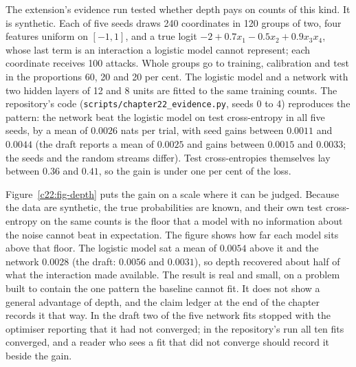 The extension's evidence run tested whether depth pays on counts of this kind. It is synthetic.
Each of five seeds draws 240 coordinates in 120 groups of two, four features uniform on $[-1,1]$,
and a true logit $-2+0.7x_1-0.5x_2+0.9x_3x_4$, whose last term is an interaction a logistic model
cannot represent; each coordinate receives 100 attacks. Whole groups go to training, calibration
and test in the proportions 60, 20 and 20 per cent. The logistic model and a network with two
hidden layers of 12 and 8 units are fitted to the same training counts. The repository's code
(\texttt{scripts/chapter22\_evidence.py}, seeds 0 to 4) reproduces the pattern: the network beat the
logistic model on test cross-entropy in all five seeds, by a mean of $0.0026$ nats per trial, with
seed gains between $0.0011$ and $0.0044$ (the draft reports a mean of $0.0025$ and gains between $0.0015$
and $0.0033$; the seeds and the random streams differ). Test cross-entropies themselves lay between
$0.36$ and $0.41$, so the gain is under one per cent of the loss.

Figure~\ref{c22:fig-depth} puts the gain on a scale where it can be judged. Because the data are synthetic, the
true probabilities are known, and their own test cross-entropy on the same counts is the floor
that a model with no information about the noise cannot beat in expectation. The figure shows how
far each model sits above that floor. The logistic model sat a mean of $0.0054$ above it and the
network $0.0028$ (the draft: $0.0056$ and $0.0031$), so depth recovered about half of what the
interaction made available. The result is real and small, on a problem built to contain the one
pattern the baseline cannot fit. It does not show a general advantage of depth, and the claim
ledger at the end of the chapter records it that way. In the draft two of the five network fits
stopped with the optimiser reporting that it had not converged; in the repository's run all ten
fits converged, and a reader who sees a fit that did not converge should record it beside the
gain.

